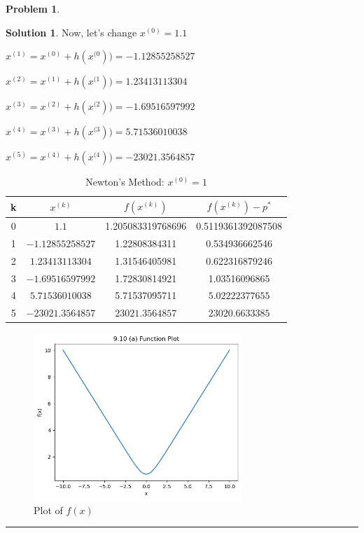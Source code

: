 \documentclass{article}
\theoremstyle{definition}
\newtheorem{problem}{Problem}
\def\fline{\rule{0.75\linewidth}{0.5pt}}
\newcommand{\finishline}{\begin{center}\fline\end{center}}
\newtheorem*{solution*}{Solution}
\newenvironment{solution}{\begin{solution*}}{{\finishline} \end{solution*}}
\begin{document}
\begin{problem}
\begin{enumerate}
\begin{solution}
Now, let's change $x^{(0)} = 1.1$ 

$x^{(1)} = x^{(0)} + h(x^{(0})) = - 1.12855258527$

    $x^{(2)} = x^{(1)} + h(x^{(1})) = 1.23413113304$

    $x^{(3)} = x^{(2)} + h(x^{(2})) = - 1.69516597992$

    $x^{(4)} = x^{(3)} + h(x^{(3})) = 5.71536010038$
    
    $x^{(5)} = x^{(4)} + h(x^{(4})) = - 23021.3564857$

    \begin{table}[h]
    \centering
    \begin{tabular}{|c|c|c|c|}
        \hline
        k & $x^{(k)}$ & $f(x^{(k)})$ & $f(x^{(k)}) - p^*$ \\
        \hline
        0 & $1.1$ & 1.205083319768696 & 0.5119361392087508 \\
        1 & $- 1.12855258527$ & 1.22808384311 & 0.534936662546 \\
        2 & $1.23413113304$ & 1.31546405981 & 0.622316879246\\
        3 & $- 1.69516597992$ & 1.72830814921 & 1.03516096865\\
        4 & $5.71536010038$ & 5.71537095711 & $5.02222377655$\\
        5 & $- 23021.3564857$ & $23021.3564857$ & $23020.6633385$\\
        \hline
    \end{tabular}
    \caption{Newton's Method: $x^{(0)} = 1$}
    \label{tab:mytable}
\end{table}

\begin{figure}[h!]
        \centering
        \includegraphics[width=0.7\textwidth]{HW5-9-10(a).png}
        \caption{Plot of $f(x)$}
    \end{figure}  


\end{solution}
\end{enumerate}
\end{problem}
\end{document}
